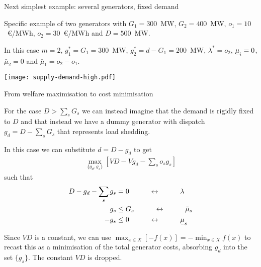 \documentclass[10pt,dvipsnames]{beamer}
\def\l{\lambda}
\def\m{\mu}
\newcommand{\ubar}[1]{\text{\b{$#1$}}}
\begin{document}
\begin{frame}{Next simplest example: several generators, fixed demand}

  Specific example of two generators with $G_1 = 300$~MW, $G_2 =
  400$~MW, $o_1 = 10$~\euro/MWh, $o_2 = 30$~\euro/MWh and $D = 500$~MW.

  In this case $m=2$, $g_1^* = G_1 = 300$~MW, $g_2^* = d - G_1 = 200$~MW,
  $\l^* = o_2$, $\ubar{\m}_i = 0$, $\bar{\m}_2 = 0$ and $\bar{\m}_1 =
  o_2 - o_1$.

  \centering
  \texttt{[image: supply-demand-high.pdf]}




\end{frame}





\begin{frame}{From welfare maximisation to cost minimisation}

  For the case $D > \sum_s G_s$ we can instead imagine that the demand
  is rigidly fixed to $D$ and that instead we have a dummy generator
  with dispatch $g_d = D-\sum_s G_s$ that represents \alert{load shedding}.

  In this case we can substitute $d = D - g_d$ to get
  \begin{align*}
    \max_{\{g_d, g_s\}}  \left[ VD - Vg_d  -  \sum_s o_s g_s \right]
  \end{align*}
  such that
  \begin{align*}
    D - g_d -  \sum_s g_s  & = 0 \hspace{1cm} \leftrightarrow \hspace{1cm} \l \\
        g_s  & \leq  G_s  \hspace{1cm}\leftrightarrow\hspace{1cm} \bar{\m}_s \\
    - g_s  & \leq  0  \hspace{1cm}\leftrightarrow\hspace{1cm} \ubar{\m}_s
  \end{align*}

  Since $VD$ is a constant, we can use
      $\max_{x\in X} \left[ -f(x)\right] = - \min_{x\in X} f(x)$
  to recast this as a minimisation of the total generator costs,
  absorbing $g_d$ into the set $\{g_s\}$. The constant $VD$ is dropped.

\end{frame}
\end{document}
